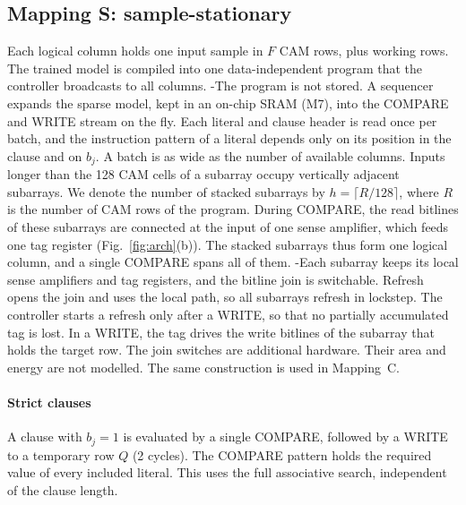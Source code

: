 \subsection{Mapping S: sample-stationary}\label{sec:mapS}
Each logical \gainp{} column holds one input sample in $F$ CAM rows, plus working rows.
The trained model is compiled into one data-independent program that the controller broadcasts to all columns.
\hyp{The program is not stored. A sequencer expands the sparse model, kept in an on-chip SRAM (M7), into the COMPARE and WRITE stream on the fly. Each literal and clause header is read once per batch, and the instruction pattern of a literal depends only on its position in the clause and on $b_j$.}
A batch is as wide as the number of available columns.
Inputs longer than the 128 CAM cells of a subarray occupy vertically adjacent subarrays.
We denote the number of stacked subarrays by $h=\lceil R/128\rceil$, where $R$ is the number of CAM rows of the program.
During COMPARE, the read bitlines of these subarrays are connected at the input of one sense amplifier, which feeds one tag register (Fig.~\ref{fig:arch}(b)).
The stacked subarrays thus form one logical column, and a single COMPARE spans all of them.
\hyp{Each subarray keeps its local sense amplifiers and tag registers, and the bitline join is switchable. Refresh opens the join and uses the local path, so all subarrays refresh in lockstep. The controller starts a refresh only after a WRITE, so that no partially accumulated tag is lost. In a WRITE, the tag drives the write bitlines of the subarray that holds the target row. The join switches are additional hardware. Their area and energy are not modelled.}
The same construction is used in Mapping~C.

\paragraph{Strict clauses}
A clause with $b_j=1$ is evaluated by a single COMPARE, followed by a WRITE to a temporary row $Q$ (2 cycles). The COMPARE pattern holds the required value of every included literal.
This uses the full associative search, independent of the clause length.

